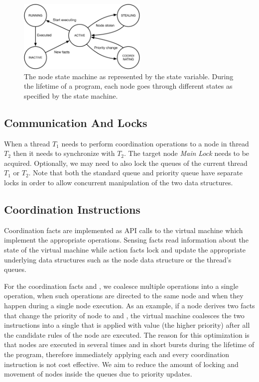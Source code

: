 \begin{figure}[ht]
   \centering
   \includegraphics[width=0.55\textwidth]{figures/implementation/node_states.pdf}
   \caption{The node state machine as represented by the state variable. During
      the lifetime of a program, each node goes through different states as
      specified by the state machine.}
   \label{fig:implementation:node_states}
\end{figure}

\subsection{Communication And Locks}

When a thread $T_1$ needs to perform coordination operations to a node in thread
$T_2$ then it needs to synchronize with $T_2$. The target node \emph{Main Lock}
needs to be acquired. Optionally, we may need to also lock the queues of the
current thread $T_1$ or $T_2$. Note that both the standard queue and priority
queue have separate locks in order to allow concurrent manipulation of the two
data structures.

\subsection{Coordination Instructions}\label{section:coordination:coord_instrs}

Coordination facts are implemented as API calls to the virtual machine which
implement the appropriate operations. Sensing facts read information about the
state of the virtual machine while action facts lock and update the appropriate
underlying data structures such as the node data structure or the thread's
queues.

For the coordination facts  and , we
coalesce multiple operations into a single operation, when such operations are
directed to the same node and when they happen during a single node execution.
As an example, if a node derives two  facts that change the
priority of node  to  and , the virtual machine
coalesces the two instructions into a single  that is applied
with value  (the higher priority) after all the candidate rules of the
node are executed. The reason for this optimization is that nodes are executed
in several times and in short bursts during the lifetime of the program,
therefore immediately applying each and every coordination instruction is not
cost effective. We aim to reduce the amount of locking and movement of nodes
inside the queues due to priority updates.
